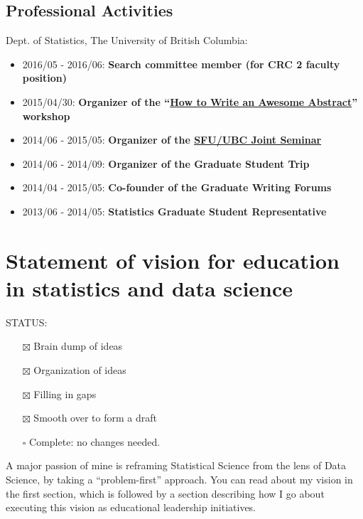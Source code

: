 \documentclass[]{article}
\providecommand{\tightlist}{%
  \setlength{\itemsep}{0pt}\setlength{\parskip}{0pt}}
\begin{document}
\hypertarget{professional-activities}{%
\subsection{Professional Activities}\label{professional-activities}}

Dept. of Statistics, The University of British Columbia:

\begin{itemize}
\tightlist
\item
  2016/05 - 2016/06: \textbf{Search committee member (for CRC 2 faculty position)}
\item
  2015/04/30: \textbf{Organizer of the ``\href{http://stat.ubc.ca/~vincen.coia/abstractworkshop.html}{How to Write an Awesome Abstract}'' workshop}
\item
  2014/06 - 2015/05: \textbf{Organizer of the \href{http://stat.ubc.ca/~vincen.coia/seminar.html}{SFU/UBC Joint Seminar}}
\item
  2014/06 - 2014/09: \textbf{Organizer of the Graduate Student Trip}
\item
  2014/04 - 2015/05: \textbf{Co-founder of the Graduate Writing Forums}
\item
  2013/06 - 2014/05: \textbf{Statistics Graduate Student Representative}
\end{itemize}

\hypertarget{statement-of-vision-for-education-in-statistics-and-data-science}{%
\section{Statement of vision for education in statistics and data science}\label{statement-of-vision-for-education-in-statistics-and-data-science}}

STATUS:

\begin{itemize}
\tightlist
\item[$\boxtimes$]
  Brain dump of ideas
\item[$\boxtimes$]
  Organization of ideas
\item[$\boxtimes$]
  Filling in gaps
\item[$\boxtimes$]
  Smooth over to form a draft
\item[$\square$]
  Complete: no changes needed.
\end{itemize}

A major passion of mine is reframing Statistical Science from the lens of Data Science, by taking a ``problem-first'' approach. You can read about my vision in the first section, which is followed by a section describing how I go about executing this vision as educational leadership initiatives.
\end{document}

